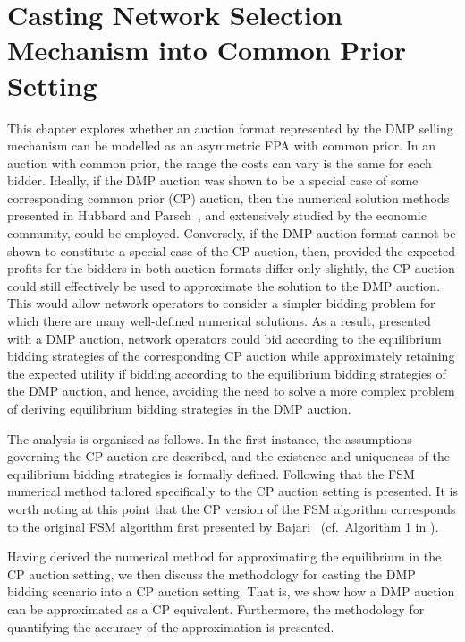 \chapter{Casting Network Selection Mechanism into Common Prior Setting}
\label{cha:approximation}

\minitoc
\vspace{10mm}

This chapter explores whether an auction format represented by the DMP selling mechanism can be modelled as an asymmetric FPA with common prior. In an auction with common prior, the range the costs can vary is the same for each bidder. Ideally, if the DMP auction was shown to be a special case of some corresponding common prior (CP) auction, then the numerical solution methods presented in Hubbard and Parsch~\cite{HubbardPaarsch2011}, and extensively studied by the economic community, could be employed. Conversely, if the DMP auction format cannot be shown to constitute a special case of the CP auction, then, provided the expected profits for the bidders in both auction formats differ only slightly, the CP auction could still effectively be used to approximate the solution to the DMP auction. This would allow network operators to consider a simpler bidding problem for which there are many well-defined numerical solutions. As a result, presented with a DMP auction, network operators could bid according to the equilibrium bidding strategies of the corresponding CP auction while approximately retaining the expected utility if bidding according to the equilibrium bidding strategies of the DMP auction, and hence, avoiding the need to solve a more complex problem of deriving equilibrium bidding strategies in the DMP auction.

The analysis is organised as follows. In the first instance, the assumptions governing the CP auction are described, and the existence and uniqueness of the equilibrium bidding strategies is formally defined. Following that the FSM numerical method tailored specifically to the CP auction setting is presented. It is worth noting at this point that the CP version of the FSM algorithm corresponds to the original FSM algorithm first presented by Bajari~\cite{Bajari2001a} (cf.~Algorithm 1 in \cite{Bajari2001a}).

Having derived the numerical method for approximating the equilibrium in the CP auction setting, we then discuss the methodology for casting the DMP bidding scenario into a CP auction setting. That is, we show how a DMP auction can be approximated as a CP equivalent. Furthermore, the methodology for quantifying the accuracy of the approximation is presented.


